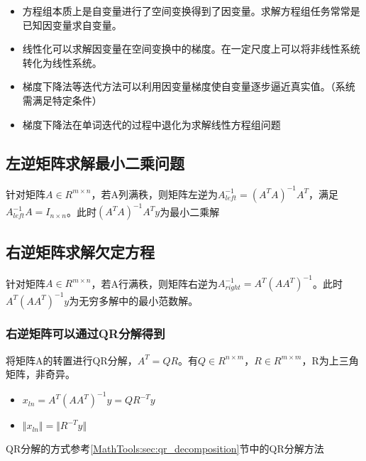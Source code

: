 \begin{lemmabox}[一些有意思的思考]
	\begin{itemize}
  \item 方程组本质上是自变量进行了空间变换得到了因变量。求解方程组任务常常是已知因变量求自变量。
  \item 线性化可以求解因变量在空间变换中的梯度。在一定尺度上可以将非线性系统转化为线性系统。
  \item 梯度下降法等迭代方法可以利用因变量梯度使自变量逐步逼近真实值。（系统需满足特定条件）
  \item 梯度下降法在单词迭代的过程中退化为求解线性方程组问题
\end{itemize}
\end{lemmabox}

\subsection{左逆矩阵求解最小二乘问题}
\begin{theorembox}
	针对矩阵$A \in R^{m\times n}$，若A列满秩，则矩阵左逆为$A_{left}^{-1} = (A^TA)^{-1}A^T$，满足$A_{left}^{-1}A = I_{n \times n}$。此时$(A^TA)^{-1}A^Ty$为最小二乘解
\end{theorembox}
\subsection{右逆矩阵求解欠定方程}
\begin{theorembox}
	针对矩阵$A \in R^{m\times n}$，若A行满秩，则矩阵右逆为$A_{right}^{-1} = A^T(AA^T)^{-1}$。此时$A^T(AA^T)^{-1}y$为无穷多解中的最小范数解。
\end{theorembox}
\subsubsection{右逆矩阵可以通过QR分解得到}

\begin{theorembox}[通过QR分解求解右逆矩阵]
	将矩阵A的转置进行QR分解，$A^T = QR$。有$Q\in R^{n\times m}$，$R\in R^{m\times m}$，R为上三角矩阵，非奇异。
	\begin{itemize}
  		\item $x_{ln} = A^T(AA^T)^{-1}y = QR^{-T}y$
  		\item $\Vert x_{ln}\Vert = \Vert R^{-T}y\Vert$
	\end{itemize}
\end{theorembox}

QR分解的方式参考\ref{MathTools:sec:qr_decomposition}节中的QR分解方法

